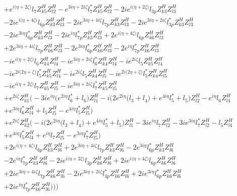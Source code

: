 \begin{align}
 &+e^{i \Big(\eta +2 \zeta \Big)} l_7 Z_{{k 5}}^{H} Z_{{l 2}}^{H} - e^{3 i \eta +2 i \zeta } l_7^* Z_{{k 5}}^{H} Z_{{l 2}}^{H} -2 i e^{i \Big(\eta +2 \zeta \Big)} l_{3p} Z_{{k 3}}^{H} Z_{{l 3}}^{H} \nonumber \\ 
 &-2 i e^{i \Big(\eta +4 \zeta \Big)} l_{6p} Z_{{k 3}}^{H} Z_{{l 3}}^{H} -2 i e^{3 i \eta +4 i \zeta } l_{7p} Z_{{k 3}}^{H} Z_{{l 3}}^{H} -2 i e^{3 i \eta +2 i \zeta } l_{3p}^* Z_{{k 3}}^{H} Z_{{l 3}}^{H} \nonumber \\ 
 &-2 i e^{3 i \eta } l_{6p}^* Z_{{k 3}}^{H} Z_{{l 3}}^{H} -2 i e^{i \eta } l_{7p}^* Z_{{k 3}}^{H} Z_{{l 3}}^{H} +2 e^{i \Big(\eta +4 \zeta \Big)} l_{6p} Z_{{k 6}}^{H} Z_{{l 3}}^{H} \nonumber \\ 
 &+2 e^{3 i \eta +4 i \zeta } l_{7p} Z_{{k 6}}^{H} Z_{{l 3}}^{H} -2 e^{3 i \eta } l_{6p}^* Z_{{k 6}}^{H} Z_{{l 3}}^{H} -2 e^{i \eta } l_{7p}^* Z_{{k 6}}^{H} Z_{{l 3}}^{H} \nonumber \\ 
 &-i e^{i \Big(\eta +2 \zeta \Big)} l_6 Z_{{k 4}}^{H} Z_{{l 4}}^{H} -i e^{3 i \eta +2 i \zeta } l_6^* Z_{{k 4}}^{H} Z_{{l 4}}^{H} -i e^{2 i \zeta } l_5 Z_{{k 5}}^{H} Z_{{l 4}}^{H} \nonumber \\ 
 &-i e^{2 i \Big(2 \eta +\zeta \Big)} l_5^* Z_{{k 5}}^{H} Z_{{l 4}}^{H} -i e^{2 i \zeta } l_5 Z_{{k 4}}^{H} Z_{{l 5}}^{H} -i e^{2 i \Big(2 \eta +\zeta \Big)} l_5^* Z_{{k 4}}^{H} Z_{{l 5}}^{H} \nonumber \\ 
 &-i e^{i \Big(\eta +2 \zeta \Big)} l_7 Z_{{k 5}}^{H} Z_{{l 5}}^{H} -i e^{3 i \eta +2 i \zeta } l_7^* Z_{{k 5}}^{H} Z_{{l 5}}^{H} \nonumber \\ 
 &+e^{2 i \zeta } Z_{{k 1}}^{H} \Big(-3 i e^{i \eta } \Big(e^{2 i \eta } l_6^*  + l_6\Big)Z_{{l 1}}^{H} -i \Big(2 e^{2 i \eta } \Big(l_3 + l_4\Big) + e^{4 i \eta } l_5^*  + l_5\Big)Z_{{l 2}}^{H} - e^{i \eta } l_6 Z_{{l 4}}^{H} \nonumber \\ 
 &+e^{3 i \eta } l_6^* Z_{{l 4}}^{H} +l_5 Z_{{l 5}}^{H} - e^{4 i \eta } l_5^* Z_{{l 5}}^{H} \Big)\nonumber \\ 
 &+e^{2 i \zeta } Z_{{k 2}}^{H} \Big(-i \Big(2 e^{2 i \eta } \Big(l_3 + l_4\Big) + e^{4 i \eta } l_5^*  + l_5\Big)Z_{{l 1}}^{H} -3 i e^{i \eta } l_7 Z_{{l 2}}^{H} -3 i e^{3 i \eta } l_7^* Z_{{l 2}}^{H} - l_5 Z_{{l 4}}^{H} \nonumber \\ 
 &+e^{4 i \eta } l_5^* Z_{{l 4}}^{H} +e^{i \eta } l_7 Z_{{l 5}}^{H} - e^{3 i \eta } l_7^* Z_{{l 5}}^{H} \Big)\nonumber \\ 
 &+2 e^{i \Big(\eta +4 \zeta \Big)} l_{6p} Z_{{k 3}}^{H} Z_{{l 6}}^{H} +2 e^{3 i \eta +4 i \zeta } l_{7p} Z_{{k 3}}^{H} Z_{{l 6}}^{H} -2 e^{3 i \eta } l_{6p}^* Z_{{k 3}}^{H} Z_{{l 6}}^{H} \nonumber \\ 
 &-2 e^{i \eta } l_{7p}^* Z_{{k 3}}^{H} Z_{{l 6}}^{H} -2 i e^{i \Big(\eta +2 \zeta \Big)} l_{3p} Z_{{k 6}}^{H} Z_{{l 6}}^{H} +2 i e^{i \Big(\eta +4 \zeta \Big)} l_{6p} Z_{{k 6}}^{H} Z_{{l 6}}^{H} \nonumber \\ 
 &+2 i e^{3 i \eta +4 i \zeta } l_{7p} Z_{{k 6}}^{H} Z_{{l 6}}^{H} -2 i e^{3 i \eta +2 i \zeta } l_{3p}^* Z_{{k 6}}^{H} Z_{{l 6}}^{H} +2 i e^{3 i \eta } l_{6p}^* Z_{{k 6}}^{H} Z_{{l 6}}^{H} \nonumber \\ 
 &+2 i e^{i \eta } l_{7p}^* Z_{{k 6}}^{H} Z_{{l 6}}^{H} \Big)\Big)\Big)\end{align} 

